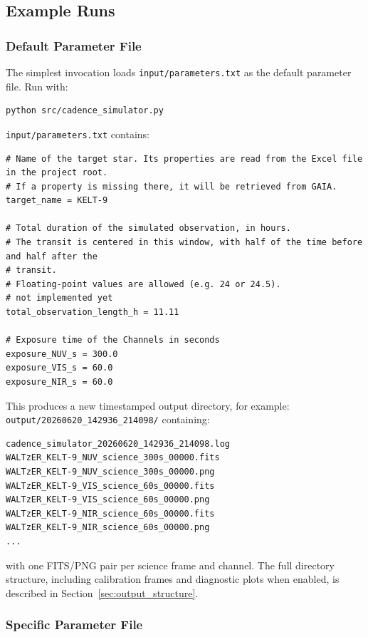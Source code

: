 \subsection{Example Runs}
\label{sec:example_runs}

\subsubsection{Default Parameter File}

The simplest invocation loads \texttt{input/parameters.txt} as the default parameter file. Run with:

\begin{verbatim}
python src/cadence_simulator.py
\end{verbatim}

\texttt{input/parameters.txt} contains:

\begin{verbatim}
# Name of the target star. Its properties are read from the Excel file in the project root.
# If a property is missing there, it will be retrieved from GAIA.
target_name = KELT-9

# Total duration of the simulated observation, in hours.
# The transit is centered in this window, with half of the time before and half after the 
# transit.
# Floating-point values are allowed (e.g. 24 or 24.5).
# not implemented yet
total_observation_length_h = 11.11

# Exposure time of the Channels in seconds
exposure_NUV_s = 300.0
exposure_VIS_s = 60.0
exposure_NIR_s = 60.0
\end{verbatim}

This produces a new timestamped output directory, for example: \texttt{output/20260620\_142936\_214098/} containing:

\begin{verbatim}
cadence_simulator_20260620_142936_214098.log
WALTzER_KELT-9_NUV_science_300s_00000.fits
WALTzER_KELT-9_NUV_science_300s_00000.png
WALTzER_KELT-9_VIS_science_60s_00000.fits
WALTzER_KELT-9_VIS_science_60s_00000.png
WALTzER_KELT-9_NIR_science_60s_00000.fits
WALTzER_KELT-9_NIR_science_60s_00000.png
...
\end{verbatim}

with one FITS/PNG pair per science frame and channel. The full directory structure, including calibration frames and diagnostic plots when enabled, is described in Section~\ref{sec:output_structure}.


\subsubsection{Specific Parameter File}

